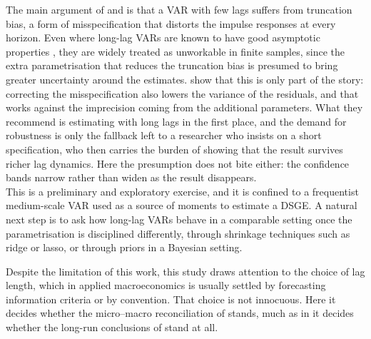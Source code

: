 \documentclass[12pt, a4paper]{article}
\begin{document}
The main argument of \citet{Long_Lag2025} and \citet{Baumeister2025} is that a VAR with few lags
suffers from truncation bias, a form of misspecification that distorts the impulse responses at
every horizon. Even where long-lag VARs are known to have good asymptotic properties
\citep{Plagborg-Moller_Wolf2021}, they are widely treated as unworkable in finite samples, since
the extra parametrisation that reduces the truncation bias is presumed to bring greater uncertainty
around the estimates. \citet{Long_Lag2025} show that this is only part of the story: correcting the
misspecification also lowers the variance of the residuals, and that works against the imprecision
coming from the additional parameters. What they recommend is estimating with long lags in the first place, and the demand for
robustness is only the fallback left to a researcher who insists on a short specification, who then
carries the burden of showing that the result survives richer lag dynamics. Here the presumption
does not bite either: the confidence bands narrow rather than widen as the result disappears.
\\

This is a preliminary and exploratory exercise, and it is confined to a frequentist medium-scale
VAR used as a source of moments to estimate a DSGE. A natural next step is to ask how long-lag
VARs behave in a comparable setting once the parametrisation is disciplined differently, through
shrinkage techniques such as ridge or lasso, or through priors in a Bayesian setting.

Despite the limitation of this work, this study draws attention to the choice of lag length, which in
applied macroeconomics is usually settled by forecasting information criteria or by convention.
That choice is not innocuous. Here it decides whether the micro--macro reconciliation of
\citet{ACEL2011} stands, much as in \citet{Baumeister2025} it decides whether the long-run
conclusions of \citet{Jorda2024long_run_mp} stand at all.

\clearpage




\clearpage
\end{document}
